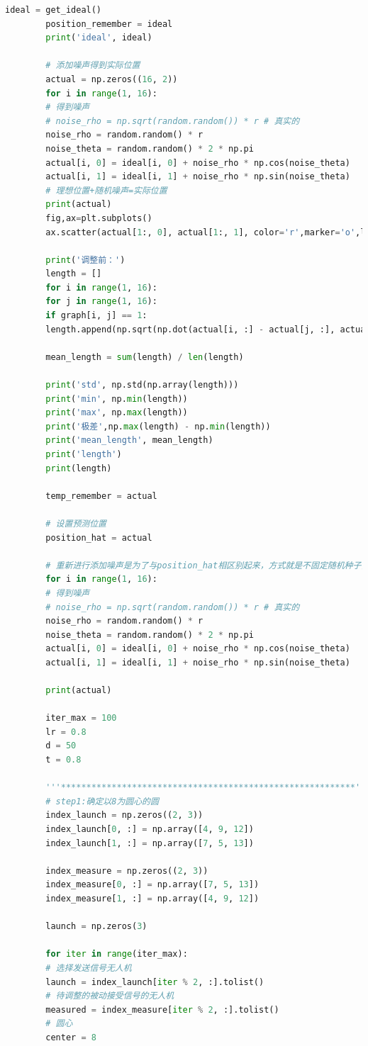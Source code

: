 \documentclass[withoutpreface,bwprint]{cumcmthesis} %
\begin{document}
\begin{lstlisting}[language=python]
		ideal = get_ideal()
		position_remember = ideal
		print('ideal', ideal)
		
		# 添加噪声得到实际位置
		actual = np.zeros((16, 2))
		for i in range(1, 16):
		# 得到噪声
		# noise_rho = np.sqrt(random.random()) * r # 真实的
		noise_rho = random.random() * r
		noise_theta = random.random() * 2 * np.pi
		actual[i, 0] = ideal[i, 0] + noise_rho * np.cos(noise_theta)
		actual[i, 1] = ideal[i, 1] + noise_rho * np.sin(noise_theta)
		# 理想位置+随机噪声=实际位置
		print(actual)
		fig,ax=plt.subplots()
		ax.scatter(actual[1:, 0], actual[1:, 1], color='r',marker='o',label='锥形编队调整前')
		
		print('调整前：')
		length = []
		for i in range(1, 16):
		for j in range(1, 16):
		if graph[i, j] == 1:
		length.append(np.sqrt(np.dot(actual[i, :] - actual[j, :], actual[i, :] - actual[j, :])))
		
		mean_length = sum(length) / len(length)
		
		print('std', np.std(np.array(length)))
		print('min', np.min(length))
		print('max', np.max(length))
		print('极差',np.max(length) - np.min(length))
		print('mean_length', mean_length)
		print('length')
		print(length)
		
		temp_remember = actual
		
		# 设置预测位置
		position_hat = actual
		
		# 重新进行添加噪声是为了与position_hat相区别起来，方式就是不固定随机种子，保证取样均匀。
		for i in range(1, 16):
		# 得到噪声
		# noise_rho = np.sqrt(random.random()) * r # 真实的
		noise_rho = random.random() * r
		noise_theta = random.random() * 2 * np.pi
		actual[i, 0] = ideal[i, 0] + noise_rho * np.cos(noise_theta)
		actual[i, 1] = ideal[i, 1] + noise_rho * np.sin(noise_theta)
		
		print(actual)
		
		iter_max = 100
		lr = 0.8
		d = 50
		t = 0.8
		
		'''**********************************************************'''
		# step1:确定以8为圆心的圆
		index_launch = np.zeros((2, 3))
		index_launch[0, :] = np.array([4, 9, 12])
		index_launch[1, :] = np.array([7, 5, 13])
		
		index_measure = np.zeros((2, 3))
		index_measure[0, :] = np.array([7, 5, 13])
		index_measure[1, :] = np.array([4, 9, 12])
		
		launch = np.zeros(3)
		
		for iter in range(iter_max):
		# 选择发送信号无人机
		launch = index_launch[iter % 2, :].tolist()
		# 待调整的被动接受信号的无人机
		measured = index_measure[iter % 2, :].tolist()
		# 圆心
		center = 8
		

\end{lstlisting}
\end{document}
